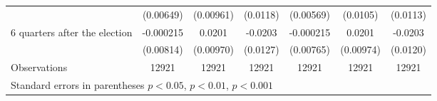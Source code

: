 \begin{table}[!ht]
\begin{tabular}{l*{6}{c}}
                    &   (0.00649)         &   (0.00961)         &    (0.0118)         &   (0.00569)         &    (0.0105)         &    (0.0113)         \\
[0,5em]
 6 quarters after the election&   -0.000215         &      0.0201\sym{*}  &     -0.0203         &   -0.000215         &      0.0201\sym{*}  &     -0.0203         \\
                    &   (0.00814)         &   (0.00970)         &    (0.0127)         &   (0.00765)         &   (0.00974)         &    (0.0120)         \\
\hline
Observations        &       12921         &       12921         &       12921         &       12921         &       12921         &       12921         \\
\hline\hline
\multicolumn{7}{l}{\footnotesize Standard errors in parentheses \sym{*} \(p<0.05\), \sym{**} \(p<0.01\), \sym{***} \(p<0.001\)}\\
\end{tabular}
\end{table}
